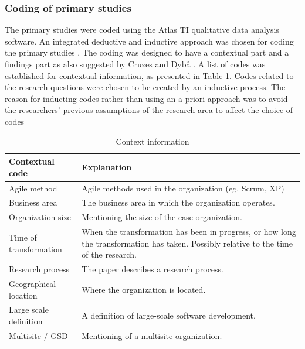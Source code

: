 \documentclass[preprint,authoryear,12pt]{elsarticle}
\begin{document}
\subsubsection{Coding of primary studies}
\label{sec:coding}

The primary studies were coded using the Atlas TI qualitative data analysis software.
An integrated deductive and inductive approach was chosen for coding the primary
studies \cite{Cruzes2011a}. The coding was designed to have a contextual part
and a findings part as also suggested by Cruzes and Dybå \cite{Cruzes2011a}. A
list of codes was established for contextual information, as presented in Table
\ref{table:contextualcodes}. Codes related to the research questions were chosen
to be created by an inductive process. The reason for inducting codes rather
than using an a priori approach was to avoid the researchers' previous
assumptions of the research area to affect the choice of codes

\begin{table}[h]
    \centering
    \begin{tabular}{ >{\raggedright\arraybackslash}p{}
                     >{\raggedright\arraybackslash}p{} }
        \toprule
        Contextual code     & Explanation   \\
        \midrule

Agile method & Agile methods used in the organization (eg. Scrum, XP) \\

Business area & The business area in which the organization operates. \\

Organization size & Mentioning the size of the case organization. \\

Time of transformation & When the transformation has been in
progress, or how long the transformation has taken. Possibly relative to
the time of the research. \\

Research process & The paper describes a research process. \\

Geographical location & Where the organization is located. \\

Large scale definition & A definition of large-scale software development. \\

Multisite / GSD & Mentioning of a multisite organization. \\

        \bottomrule
    \end{tabular}
    \caption{Context information}
    \label{table:contextualcodes}
\end{table}
\end{document}
